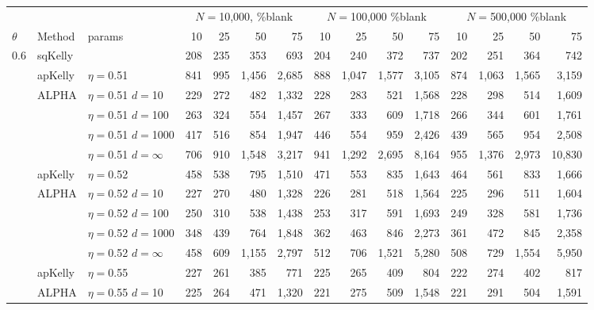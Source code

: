 \documentclass[aoas]{imsart}
\begin{document}
\begin{table}
\centering
\tiny
\begin{tabular}{lll|rrrr|rrrr|rrrr} 
& & & \multicolumn{4}{|c|}{$N=$10,000, \%blank} &  \multicolumn{4}{|c|}{$N=$100,000 \%blank} & \multicolumn{4}{|c}{$N=$500,000 \%blank} \\ 
$\theta$ & Method & params & 10 & 25 & 50 & 75  & 10 & 25 & 50 & 75  & 10 & 25 & 50 & 75  \\
\hline 0.6 & sqKelly & & 208  & 235  & 353  & 693  & 204  & 240  & 372  & 737  & 202  & 251  & 364  & 742  \\
\cline{2-15} & apKelly & $\eta=$0.51 & 841  & 995  & 1,456  & 2,685  & 888  & 1,047  & 1,577  & 3,105  & 874  & 1,063  & 1,565  & 3,159  \\
\cline{2-15}
& ALPHA & $\eta=$0.51 $d=$10 & 229  & 272  & 482  & 1,332  & 228  & 283  & 521  & 1,568  & 228  & 298  & 514  & 1,609  \\
&  & $\eta=$0.51 $d=$100 & 263  & 324  & 554  & 1,457  & 267  & 333  & 609  & 1,718  & 266  & 344  & 601  & 1,761  \\
&  & $\eta=$0.51 $d=$1000 & 417  & 516  & 854  & 1,947  & 446  & 554  & 959  & 2,426  & 439  & 565  & 954  & 2,508  \\
 &  & $\eta=$0.51 $d=\infty$ & 706  & 910  & 1,548  & 3,217  & 941  & 1,292  & 2,695  & 8,164  & 955  & 1,376  & 2,973  & 10,830  \\
\cline{2-15} & apKelly & $\eta=$0.52 & 458  & 538  & 795  & 1,510  & 471  & 553  & 835  & 1,643  & 464  & 561  & 833  & 1,666  \\
\cline{2-15}
& ALPHA & $\eta=$0.52 $d=$10 & 227  & 270  & 480  & 1,328  & 226  & 281  & 518  & 1,564  & 225  & 296  & 511  & 1,604  \\
&  & $\eta=$0.52 $d=$100 & 250  & 310  & 538  & 1,438  & 253  & 317  & 591  & 1,693  & 249  & 328  & 581  & 1,736  \\
&  & $\eta=$0.52 $d=$1000 & 348  & 439  & 764  & 1,848  & 362  & 463  & 846  & 2,273  & 361  & 472  & 845  & 2,358  \\
 &  & $\eta=$0.52 $d=\infty$ & 458  & 609  & 1,155  & 2,797  & 512  & 706  & 1,521  & 5,280  & 508  & 729  & 1,554  & 5,950  \\
\cline{2-15} & apKelly & $\eta=$0.55 & 227  & 261  & 385  & 771  & 225  & 265  & 409  & 804  & 222  & 274  & 402  & 817  \\
\cline{2-15}
& ALPHA & $\eta=$0.55 $d=$10 & 225  & 264  & 471  & 1,320  & 221  & 275  & 509  & 1,548  & 221  & 291  & 504  & 1,591  \\

\end{tabular}
\end{table}
\end{document}
